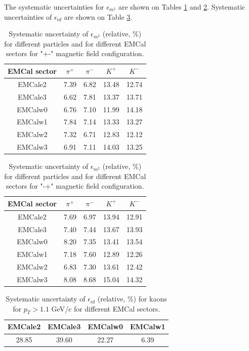 The systematic uncertainties for $\epsilon_{m^2}$ are shown on Tables \ref{table:epsilon_m2_sys+-} and \ref{table:epsilon_m2_sys-+}. Systematic uncertainties of $\epsilon_{id}$ are shown on Table \ref{table:epsilon_id_sys}.

\begin{table}[h!]
	\centering
	\begin{tabular}{c||c|c|c|c}
      EMCal sector & $\pi^+$ & $\pi^-$ & $K^+$ & $K^-$ \\
      \hline
      \hline
      EMCale2 & 7.39 & 6.82 & 13.48 & 12.74 \\
      EMCale3 & 6.62 & 7.81 & 13.37 & 13.71 \\
      EMCalw0 & 6.76 & 7.10 & 11.99 & 14.18 \\
      EMCalw1 & 7.84 & 7.14 & 13.33 & 13.27 \\
      EMCalw2 & 7.32 & 6.71 & 12.83 & 12.12 \\
      EMCalw3 & 6.91 & 7.11 & 14.03 & 13.25 \\
   \end{tabular}
   \caption{Systematic uncertainty of $\epsilon_{m^2}$ (relative, \%) for different particles and for different EMCal sectors for "+-" magnetic field configuration.}
   \label{table:epsilon_m2_sys+-}
\end{table}

\begin{table}[h!]
	\centering
	\begin{tabular}{c||c|c|c|c}
      EMCal sector & $\pi^+$ & $\pi^-$ & $K^+$ & $K^-$ \\
      \hline
      \hline
      EMCale2 & 7.69 & 6.97 & 13.94 & 12.91 \\
      EMCale3 & 7.40 & 7.44 & 13.67 & 13.93 \\
      EMCalw0 & 8.20 & 7.35 & 13.41 & 13.54 \\
      EMCalw1 & 7.18 & 7.60 & 12.89 & 12.26 \\
      EMCalw2 & 6.83 & 7.30 & 13.61 & 12.42 \\
      EMCalw3 & 8.08 & 8.68 & 15.04 & 14.32 \\
   \end{tabular}
   \caption{Systematic uncertainty of $\epsilon_{m^2}$ (relative, \%) for different particles and for different EMCal sectors for "-+" magnetic field configuration.}
   \label{table:epsilon_m2_sys-+}
\end{table}

\begin{table}[h!]
	\centering
	\begin{tabular}{c|c|c|c}
      EMCale2 & EMCale3 & EMCalw0 & EMCalw1 \\
      \hline
      28.85 & 39.60 & 22.27 & 6.39 \\
   \end{tabular}
   \caption{Systematic uncertainty of $\epsilon_{id}$ (relative, \%) for kaons for $p_T > 1.1$ GeV/c for different EMCal sectors.}
   \label{table:epsilon_id_sys}
\end{table}

